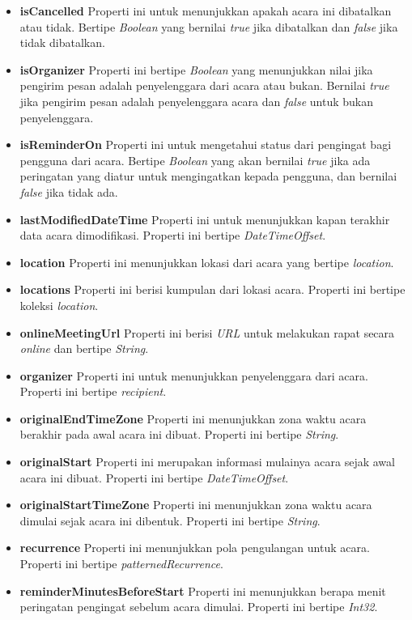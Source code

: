 \begin{itemize}
	\item \textbf{isCancelled}
	Properti ini untuk menunjukkan apakah acara ini dibatalkan atau tidak. Bertipe \textit{Boolean} yang bernilai \textit{true} jika dibatalkan dan \textit{false} jika tidak dibatalkan. 
	\item \textbf{isOrganizer}
	Properti ini bertipe \textit{Boolean} yang menunjukkan nilai jika pengirim pesan adalah penyelenggara dari acara atau bukan. Bernilai \textit{true} jika pengirim pesan adalah penyelenggara acara dan \textit{false} untuk bukan penyelenggara. 
	\item \textbf{isReminderOn}
	Properti ini untuk mengetahui status dari pengingat bagi pengguna dari acara. Bertipe \textit{Boolean} yang akan bernilai \textit{true} jika ada peringatan yang diatur untuk mengingatkan kepada pengguna, dan bernilai \textit{false} jika tidak ada. 
	\item \textbf{lastModifiedDateTime}
	Properti ini untuk menunjukkan kapan terakhir data acara dimodifikasi. Properti ini bertipe \textit{DateTimeOffset}. 
	\item \textbf{location}
	Properti ini menunjukkan lokasi dari acara yang bertipe \textit{location}. 
	\item \textbf{locations}
	Properti ini berisi kumpulan dari lokasi acara. Properti ini bertipe koleksi \textit{location}.
	\item \textbf{onlineMeetingUrl}
	Properti ini berisi \textit{URL} untuk melakukan rapat secara \textit{online} dan bertipe \textit{String}. 
	\item \textbf{organizer}
	Properti ini untuk menunjukkan penyelenggara dari acara. Properti ini bertipe \textit{recipient}. 
	\item \textbf{originalEndTimeZone}
	Properti ini menunjukkan zona waktu acara berakhir pada awal acara ini dibuat. Properti ini bertipe \textit{String}. 
	\item \textbf{originalStart}
	Properti ini merupakan informasi mulainya acara sejak awal acara ini dibuat. Properti ini bertipe \textit{DateTimeOffset}.  
	\item \textbf{originalStartTimeZone}
	Properti ini menunjukkan zona waktu acara dimulai sejak acara ini dibentuk. Properti ini bertipe \textit{String}. 
	\item \textbf{recurrence}
	Properti ini menunjukkan pola pengulangan untuk acara. Properti ini bertipe \textit{patternedRecurrence}. 
	\item \textbf{reminderMinutesBeforeStart}
	Properti ini menunjukkan berapa menit peringatan pengingat sebelum acara dimulai. Properti ini bertipe \textit{Int32}. 

\end{itemize}
